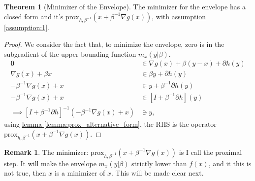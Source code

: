 \documentclass[]{article}
\theoremstyle{definition}
\newtheorem{theorem}{Theorem}       %
\newtheorem{remark}{Remark}[subsection]
{
    \newtheorem{assumption}{Assumption}
}
\begin{document}
        \begin{theorem}[Minimizer of the Envelope]\label{thm:minimizer_envelope}
            The minimizer for the envelope has a closed form and it's $\text{prox}_{h, \beta^{-1}}(x + \beta^{-1}\nabla g(x))$, with \hyperref[assumption:1]{assumption \ref*{assumption:1}}. 
        \end{theorem}
        \begin{proof}
            We consider the fact that, to minimize the envelope, zero is in the subgradient of the upper bounding function $m_x(y|\beta)$. 
            \begin{align*}
                \mathbf 0 &\in 
                \nabla g(x) + {\beta}(y - x) + \partial h(y)
                \\
                \nabla g(x) + \beta x & \in
                \beta y + \partial h(y)
                \\
                -\beta^{-1} \nabla g(x) + x &\in y + \beta^{-1} \partial h(y)
                \\
                -\beta^{-1} \nabla g(x) + x &\in [I + \beta^{-1} \partial h](y)
                \\
                \implies
                [I + \beta^{-1}\partial h]^{-1}(- \beta^{-1} \nabla g(x) + x) 
                & \ni y,
            \end{align*}
            using \hyperref[lemma:prox_alternative_form]{lemma \ref*{lemma:prox_alternative_form}}, the RHS is the operator $\text{prox}_{h, \beta^{-1}}(x + \beta^{-1}\nabla g(x))$. 
        \end{proof}
        \begin{remark}
            The minimizer: $\text{prox}_{h, \beta^{-1}}(x + \beta^{-1}\nabla g(x))$ is I call the proximal step. It will make the envelope $m_x(y|\beta)$ strictly lower than $f(x)$, and it this is not true, then $x$ is a minimizer of $x$. This will be made clear next. 
        \end{remark}
\end{document}
